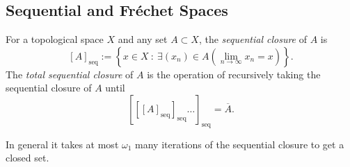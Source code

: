 \documentclass{article}
\newcommand{\seqcl}[1]{{[#1]_{\text{seq}}}}
\begin{document}
\subsection{Sequential and Fréchet Spaces}

\begin{defn}\cite{AH90}
    For a topological space \(X\) and any set \(A \subset X\), the \textit{sequential closure} of \(A\) is  
    \[
        \seqcl{A} := \left\{x \in X \: : \: \exists (x_n) \in A \left(\lim_{n\to \infty} x_n = x\right) \right\}.
    \]
    The \textit{total sequential closure} of \(A\) is the operation of recursively taking the sequential closure of \(A\) until 
    \[
        \seqcl{\seqcl{\seqcl{A}}\dots} = \overline{A}.
    \]
\end{defn}

\begin{fact}
    In general it takes at most \(\omega_1\) many iterations of the sequential closure to get a closed set. 
\end{fact}
\end{document}
